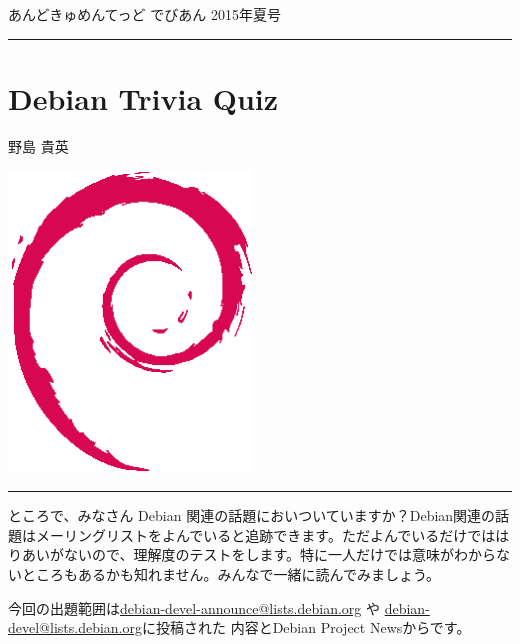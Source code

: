\documentclass[mingoth,a4paper]{jsarticle}
\renewcommand{\dancersection}[2]{%
\newpage
あんどきゅめんてっど でびあん 2015年夏号
%
\vspace{0.1mm}\\
{\color{dancerdarkblue}\rule{\hsize}{2mm}}

%
%
\begin{minipage}[t]{0.6\hsize}
\color{dancerdarkblue}
\vspace{1cm}
\section{#1}
\hfill{}#2\\
\end{minipage}
\begin{minipage}[t]{0.4\hsize}
\vspace{-2cm}
\hfill{}\includegraphics[height=8cm]{image200502/openlogo-nd.eps}\\
\vspace{-5cm}
\end{minipage}
%
{\color{dancerlightblue}\rule{0.66\hsize}{2mm}}
%
\vspace{2cm}
}
\begin{document}




\clearpage
\dancersection{Debian Trivia Quiz}{野島 貴英}

ところで、みなさん Debian 関連の話題においついていますか？Debian関連の話
題はメーリングリストをよんでいると追跡できます。ただよんでいるだけではは
りあいがないので、理解度のテストをします。特に一人だけでは意味がわからな
いところもあるかも知れません。みんなで一緒に読んでみましょう。

今回の出題範囲は\url{debian-devel-announce@lists.debian.org} や \url{debian-devel@lists.debian.org}に投稿された
内容とDebian Project Newsからです。

\begin{multicols}{2}






\end{multicols}

\printindex
\end{document}
